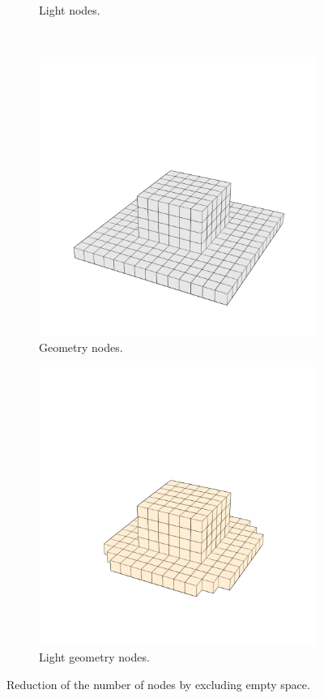 \begin{figure}[t]
\begin{subfigure}[b]{0.249\textwidth}
  \caption{Light nodes.}
  \label{fig:vo-subsets:1}
  \end{subfigure}\\
  \begin{subfigure}[b]{0.249\textwidth}
    \centering
  \includegraphics[width=\textwidth]{./img/raw/besluit-geom/geom.png}
  \caption{Geometry nodes.}
  \label{fig:vo-geometrie:0}
  \end{subfigure}%
  \begin{subfigure}[b]{0.249\textwidth}
    \centering
  \includegraphics[width=\textwidth]{./img/raw/besluit-geom/comb.png}
  \caption{Light geometry nodes.}
  \label{fig:vo-subsets:1}
  \end{subfigure}
  \caption{Reduction of the number of nodes by excluding empty space.}
  \label{fig:vo-geometrie}
\end{figure}
